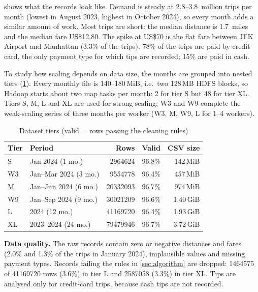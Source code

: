  shows what the records look like. Demand is steady at 2.8--3.8~million
trips per month (lowest in August 2023, highest in October 2024), so every month adds a
similar amount of work. Most trips are short: the median distance is 1.7~miles and the
median fare US\$12.80. The spike at US\$70 is the flat fare between JFK Airport and
Manhattan (3.3\% of the trips). 78\% of the trips are paid by credit card, the only
payment type for which tips are recorded; 15\% are paid in cash.

To study how scaling depends on data size, the months are grouped into nested tiers
(\cref{tab:tiers}). Every monthly file is 140--180\,MiB, i.e.\ two 128\,MB HDFS
blocks, so Hadoop starts about two map tasks per month: 2 for tier S but 48 for
tier XL. Tiers S, M, L and XL are used for strong scaling; W3 and W9 complete the
weak-scaling series of three months per worker (W3, M, W9, L for 1--4 workers).

\begin{table}[t]
\centering
\caption{Dataset tiers (valid = rows passing the cleaning rules)}\label{tab:tiers}
\begin{tabular*}{\columnwidth}{@{\extracolsep{\fill}}llrrr@{}}
\toprule
Tier & Period & Rows & Valid & CSV size \\
\midrule
S  & Jan 2024 (1 mo.)       & \num{2964624}  & 96.8\% & 142\,MiB \\
W3 & Jan--Mar 2024 (3 mo.)  & \num{9554778}  & 96.4\% & 457\,MiB \\
M  & Jan--Jun 2024 (6 mo.)  & \num{20332093} & 96.7\% & 974\,MiB \\
W9 & Jan--Sep 2024 (9 mo.)  & \num{30021209} & 96.6\% & 1.40\,GiB \\
L  & 2024 (12 mo.)          & \num{41169720} & 96.4\% & 1.93\,GiB \\
XL & 2023--2024 (24 mo.)    & \num{79479946} & 96.7\% & 3.72\,GiB \\
\bottomrule
\end{tabular*}
\end{table}

\textbf{Data quality.} The raw records contain zero or negative distances and fares
(2.0\% and 1.3\% of the trips in January 2024), implausible values and missing payment
types. Records failing the rules in \cref{sec:algorithm} are dropped: \num{1464575} of
\num{41169720} rows (3.6\%) in tier L and \num{2587058} (3.3\%) in tier XL. Tips are
analysed only for credit-card trips, because cash tips are not recorded.
